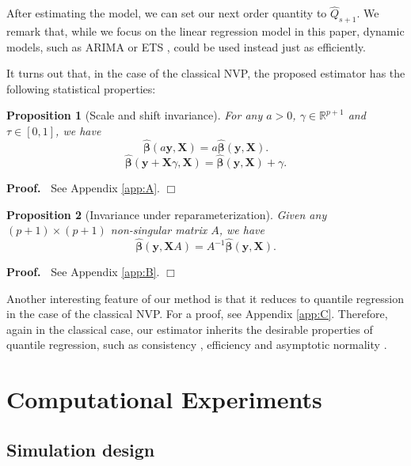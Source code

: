 \documentclass{article}
\newtheorem{proposition}{Proposition}
\newenvironment{proof}
 {\begin{trivlist} \item[] {\bf Proof.\ }}{\hfill$\Box$ \end{trivlist}}
\begin{document}
After estimating the model, we can set our next order quantity to $\hat{Q}_{s+1}$. We remark that, while we focus on the linear regression model in this paper, dynamic models, such as ARIMA or ETS \cite{HKO08}, could be used instead just as efficiently. 

It turns out that, in the case of the classical NVP, the proposed estimator has the following statistical properties:
\begin{proposition}[Scale and shift invariance]
For any $a>0$, $\gamma\in \mathbb{R}^{p+1}$ and $\tau\in[0,1]$, we have
\[
    \hat{\boldsymbol{\beta}}(a\mathbf{y},\mathbf{X})=a\hat{\boldsymbol{\beta}}(\mathbf{y},\mathbf{X}).
\]
\[
    \hat{\boldsymbol{\beta}}(\mathbf{y}+\mathbf{X}\gamma,\mathbf{X})=
    \hat{\boldsymbol{\beta}}(\mathbf{y},\mathbf{X})+\gamma.
\]
\end{proposition}
\begin{proof}
See Appendix \ref{app:A}.
\end{proof}

\begin{proposition}[Invariance under reparameterization]
Given any $(p+1)\times (p+1)$ non-singular matrix $A$, we have
\[
        \hat{\boldsymbol{\beta}}(\mathbf{y},\mathbf{X}A)=A^{-1}\hat{\boldsymbol{\beta}}(\mathbf{y},\mathbf{X}).
\]
\end{proposition}
\begin{proof}
See Appendix \ref{app:B}.
\end{proof}

Another interesting feature of our method is that it reduces to quantile regression in the case of the classical NVP. For a proof, see Appendix \ref{app:C}. Therefore, again in the classical case, our estimator
inherits the desirable properties of quantile regression, such as
consistency \cite{Koe05}, efficiency \cite{KM99} and asymptotic
normality \cite{KHM05}.

\section{Computational Experiments} \label{se:results}

\subsection{Simulation design}
\end{document}

